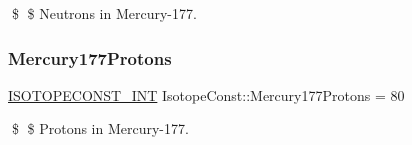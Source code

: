 \$ \$ Neutrons in Mercury-\/177. \mbox{\label{group___isotope_const-_mercury-_hg177_ga68cc2c1ab18b6afeb35172c21bbdf88f}} 
\subsubsection{\texorpdfstring{Mercury177\+Protons}{Mercury177Protons}}
{\footnotesize\ttfamily \mbox{\hyperlink{group___isotope_const-_macros_ga5f18360b3e99483a35c32d789e62621c}{I\+S\+O\+T\+O\+P\+E\+C\+O\+N\+S\+T\+\_\+\+I\+NT}} Isotope\+Const\+::\+Mercury177\+Protons = 80}

\$ \$ Protons in Mercury-\/177. 